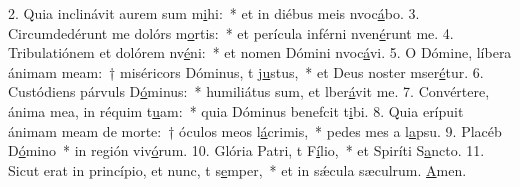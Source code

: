 2. Quia inclinávit aurem sum m\uline{i}hi:~* et in diébus meis nvoc\uline{á}bo.
3. Circumdedérunt me dolórs m\uline{o}rtis:~* et perícula inférni nven\uline{é}runt me.
4. Tribulatiónem et dolórem nv\uline{é}ni:~* et nomen Dómini nvoc\uline{á}vi.
5. O Dómine, líbera ánimam meam:~† miséricors Dóminus, t j\uline{u}stus,~* et Deus noster mser\uline{é}tur.
6. Custódiens párvuls D\uline{ó}minus:~* humiliátus sum, et lber\uline{á}vit me.
7. Convértere, ánima mea, in réquim t\uline{u}am:~* quia Dóminus benefcit t\uline{i}bi.
8. Quia erípuit ánimam meam de morte:~† óculos meos  l\uline{á}crimis,~* pedes mes a l\uline{a}psu.
9. Placéb D\uline{ó}mino~* in región viv\uline{ó}rum.
10. Glória Patri, t F\uline{í}lio,~* et Spiríti S\uline{a}ncto.
11. Sicut erat in princípio, et nunc, t s\uline{e}mper,~* et in sǽcula sæculrum. \uline{A}men.
